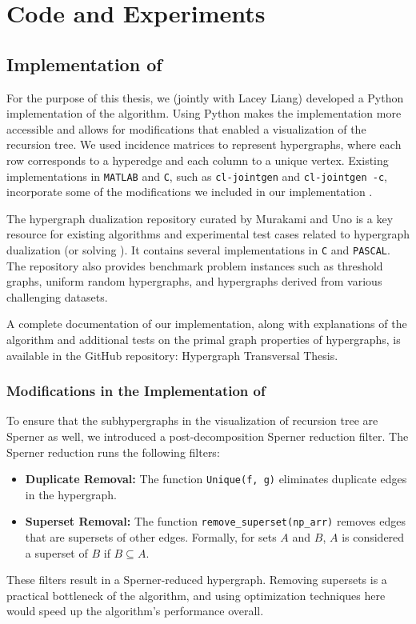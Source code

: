 \chapter{Code and Experiments}

\section{Implementation of \FKA}

For the purpose of this thesis, we (jointly with Lacey Liang) developed a Python implementation of the \FKA{} algorithm. Using Python makes the implementation more accessible and allows for modifications that enabled a visualization of the recursion tree. We used incidence matrices to represent hypergraphs, where each row corresponds to a hyperedge and each column to a unique vertex. Existing implementations in \texttt{MATLAB} and \texttt{C}, such as \texttt{cl-jointgen} and \texttt{cl-jointgen -c}, incorporate some of the modifications we included in our implementation \cite{HKS08}.

The hypergraph dualization repository curated by Murakami and Uno \cite{Uno24} is a key resource for existing algorithms and experimental test cases related to hypergraph dualization (or solving \TransHyp). It contains several implementations in \texttt{C} and \texttt{PASCAL}. The repository also provides benchmark problem instances such as threshold graphs, uniform random hypergraphs, and hypergraphs derived from various challenging datasets.

A complete documentation of our implementation, along with explanations of the algorithm and additional tests on the primal graph properties of hypergraphs, is available in the GitHub repository: Hypergraph Transversal Thesis.

\subsection{Modifications in the Implementation of \FKA}

To ensure that the subhypergraphs in the visualization of \FKA{} recursion tree are Sperner as well, we introduced a post-decomposition Sperner reduction filter. The Sperner reduction runs the following filters:
\begin{itemize}
\item \textbf{Duplicate Removal:} The function \texttt{Unique(f, g)} eliminates duplicate edges in the hypergraph.
\item \textbf{Superset Removal:} The function \texttt{remove\_superset(np\_arr)} removes edges that are supersets of other edges. Formally, for sets $A$ and $B$, $A$ is considered a superset of $B$ if $B\subseteq A$.
\end{itemize}
These filters result in a Sperner-reduced hypergraph. Removing supersets is a practical bottleneck of the algorithm, and using optimization techniques here would speed up the algorithm's performance overall.

